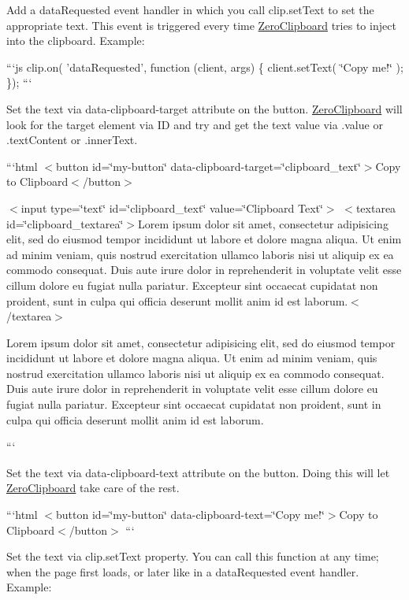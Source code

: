 \begin{DoxyEnumerate}
\item Add a {\ttfamily data\-Requested} event handler in which you call {\ttfamily clip.\-set\-Text} to set the appropriate text. This event is triggered every time \hyperlink{class_zero_clipboard}{Zero\-Clipboard} tries to inject into the clipboard. Example\-:

```js clip.\-on( 'data\-Requested', function (client, args) \{ client.\-set\-Text( \char`\"{}\-Copy me!\char`\"{} ); \}); ```
\item Set the text via {\ttfamily data-\/clipboard-\/target} attribute on the button. \hyperlink{class_zero_clipboard}{Zero\-Clipboard} will look for the target element via I\-D and try and get the text value via {\ttfamily .value} or {\ttfamily .text\-Content} or {\ttfamily .inner\-Text}.

```html $<$button id=\char`\"{}my-\/button\char`\"{} data-\/clipboard-\/target=\char`\"{}clipboard\-\_\-text\char`\"{}$>$Copy to Clipboard$<$/button$>$

$<$input type=\char`\"{}text\char`\"{} id=\char`\"{}clipboard\-\_\-text\char`\"{} value=\char`\"{}\-Clipboard Text\char`\"{}$>$ $<$textarea id=\char`\"{}clipboard\-\_\-textarea\char`\"{}$>$Lorem ipsum dolor sit amet, consectetur adipisicing elit, sed do eiusmod tempor incididunt ut labore et dolore magna aliqua. Ut enim ad minim veniam, quis nostrud exercitation ullamco laboris nisi ut aliquip ex ea commodo consequat. Duis aute irure dolor in reprehenderit in voluptate velit esse cillum dolore eu fugiat nulla pariatur. Excepteur sint occaecat cupidatat non proident, sunt in culpa qui officia deserunt mollit anim id est laborum.$<$/textarea$>$ 
\begin{DoxyPre}Lorem ipsum dolor sit amet, consectetur adipisicing elit, sed do eiusmod
  tempor incididunt ut labore et dolore magna aliqua. Ut enim ad minim veniam,
  quis nostrud exercitation ullamco laboris nisi ut aliquip ex ea commodo
  consequat. Duis aute irure dolor in reprehenderit in voluptate velit esse
  cillum dolore eu fugiat nulla pariatur. Excepteur sint occaecat cupidatat non
  proident, sunt in culpa qui officia deserunt mollit anim id est laborum.\end{DoxyPre}
 ```
\item Set the text via {\ttfamily data-\/clipboard-\/text} attribute on the button. Doing this will let \hyperlink{class_zero_clipboard}{Zero\-Clipboard} take care of the rest.

```html $<$button id=\char`\"{}my-\/button\char`\"{} data-\/clipboard-\/text=\char`\"{}\-Copy me!\char`\"{}$>$Copy to Clipboard$<$/button$>$ ```
\item Set the text via {\ttfamily clip.\-set\-Text} property. You can call this function at any time; when the page first loads, or later like in a {\ttfamily data\-Requested} event handler. Example\-:


\end{DoxyEnumerate}
